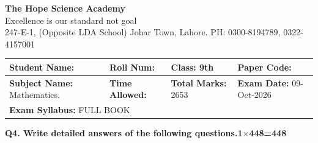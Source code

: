 \documentclass[11pt,a4paper]{article}
\begin{document}
\begin{center}
  {\Huge\bfseries The Hope Science Academy}\\[3pt]
  {\small Excellence is our standard not goal}\\[2pt]
  {\small 247-E-1, (Opposite LDA School) Johar Town, Lahore. PH: 0300-8194789, 0322-4157001}
\end{center}
\medskip\noindent
\begin{tabularx}{\linewidth}{|X|X|X|X|}
\hline
\textbf{Student Name:} & \textbf{Roll Num:} & \textbf{Class:} 9th & \textbf{Paper Code:} \\ \hline
\textbf{Subject Name:} Mathematics. & \textbf{Time Allowed:} & \textbf{Total Marks:} 2653 & \textbf{Exam Date:} 09-Oct-2026 \\ \hline
\multicolumn{4}{|l|}{\textbf{Exam Syllabus:} FULL BOOK} \\ \hline
\end{tabularx}
\bigskip
\noindent\textbf{Q4. Write detailed answers of the following questions.}\hfill\textbf{1$\times$448=448}
\end{document}
